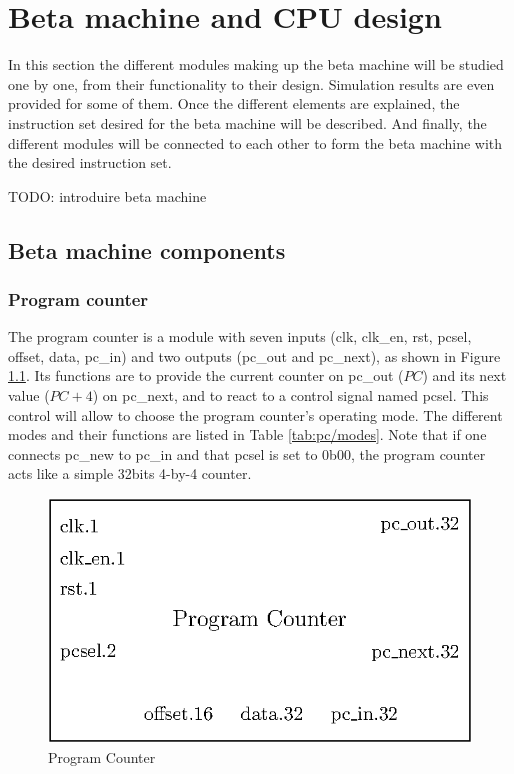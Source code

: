 \chapter{Beta machine and CPU design}

In this section the different modules making up the beta machine will be studied one by one, from 
their functionality to their design. Simulation results are even provided for some of them. Once the 
different elements are explained, the instruction set desired for the beta machine will be 
described. And finally, the different modules will be connected to each other to form the beta
machine with the desired instruction set.

TODO: introduire beta machine

\section{Beta machine components}

\subsection{Program counter}

The program counter is a module with seven inputs (clk, clk\_en, rst, pcsel, offset, data, pc\_in) 
and two outputs (pc\_out and pc\_next), as shown in Figure \ref{fig:components/pc}. 
Its functions are to provide the current counter on pc\_out ($PC$) and its 
next value ($PC + 4$) on pc\_next, and to react to a control signal named pcsel. This control 
will allow to choose the program counter's operating mode. The different modes and their functions
are listed in Table \ref{tab:pc/modes}. Note that if one connects pc\_new to pc\_in and that pcsel
is set to 0b00, the program counter acts like a simple 32bits 4-by-4 counter.

\begin{figure}[H]
    \centering
    \includegraphics[scale=0.8]{Chapter3-CPU/res/pc}
    \caption{Program Counter}
    \label{fig:components/pc}
\end{figure}

